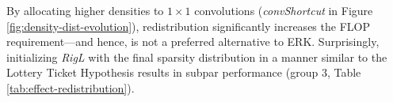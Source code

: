 

By allocating higher densities to $1 \times 1$ convolutions (\textit{convShortcut} in Figure \ref{fig:density-dist-evolution}), redistribution significantly increases the FLOP requirement---and hence, is not a preferred alternative to ERK. Surprisingly, initializing \textit{RigL} with the final sparsity distribution in a manner similar to the Lottery Ticket Hypothesis results in subpar performance (group 3, Table \ref{tab:effect-redistribution}). 

